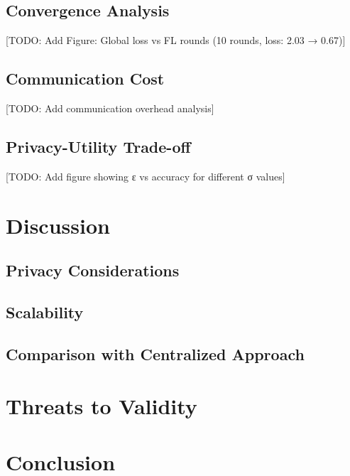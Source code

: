 \documentclass[conference]{IEEEtran}
\begin{document}
\subsection{Convergence Analysis}

[TODO: Add Figure: Global loss vs FL rounds (10 rounds, loss: 2.03 → 0.67)]

\subsection{Communication Cost}

[TODO: Add communication overhead analysis]

\subsection{Privacy-Utility Trade-off}

[TODO: Add figure showing ε vs accuracy for different σ values]

\section{Discussion}

\subsection{Privacy Considerations}
\subsection{Scalability}
\subsection{Comparison with Centralized Approach}

\section{Threats to Validity}

\section{Conclusion}
\end{document}
